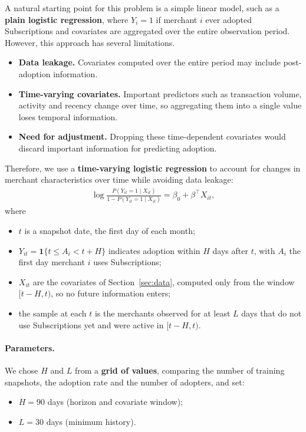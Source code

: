\documentclass[11pt]{article}
\begin{document}
A natural starting point for this problem is a simple linear model, such as a \textbf{plain logistic regression}, where $Y_i = 1$ if merchant $i$ ever adopted Subscriptions and covariates are aggregated over the entire observation period. However, this approach has several limitations.
\begin{itemize}
  \item \textbf{Data leakage.} Covariates computed over the entire period may include post-adoption information.
  \item \textbf{Time-varying covariates.} Important predictors such as transaction volume, activity and recency change over time, so aggregating them into a single value loses temporal information.
  \item \textbf{Need for adjustment.} Dropping these time-dependent covariates would discard important information for predicting adoption.
\end{itemize}

Therefore, we use a \textbf{time-varying logistic regression} to account for changes in merchant characteristics over time while avoiding data leakage:
\begin{align*}
\log \frac{P(Y_{it} = 1 \mid X_{it})}{1 - P(Y_{it} = 1 \mid X_{it})} = \beta_0 + \beta^\top X_{it},
\end{align*}
where
\begin{itemize}
  \item $t$ is a snapshot date, the first day of each month;
  \item $Y_{it} = \mathbf{1}\{t \le A_i < t + H\}$ indicates adoption within $H$ days after $t$, with $A_i$ the first day merchant $i$ uses Subscriptions;
  \item $X_{it}$ are the covariates of Section~\ref{sec:data}, computed only from the window $[t - H, t)$, so no future information enters;
  \item the sample at each $t$ is the merchants observed for at least $L$ days that do not use Subscriptions yet and were active in $[t - H, t)$.
\end{itemize}

\paragraph{Parameters.} We chose $H$ and $L$ from a \textbf{grid of values}, comparing the number of training snapshots, the adoption rate and the number of adopters, and set:
\begin{itemize}
  \item $H = 90$ days (horizon and covariate window);
  \item $L = 30$ days (minimum history).
\end{itemize}
\end{document}
